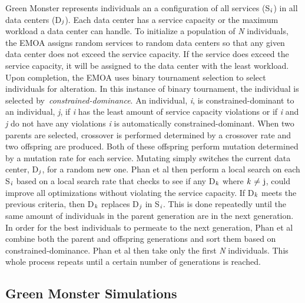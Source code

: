 \documentclass{sig-alternate}
\begin{document}
Green Monster represents individuals an a configuration of all services (S$_{\text{\emph{i}}}$) in all data centers (D$_{\text{\emph{j}}}$). Each data center has a service capacity
or the maximum workload a data center can handle. To initialize a population of \emph{N} individuals, the EMOA assigns random services to random data centers so that any given data center does not exceed the service capacity. If the service does exceed the service capacity, it will be assigned to the data center with the least workload. Upon completion, the EMOA uses binary tournament selection to select individuals for alteration. In this instance of binary tournament, the individual is selected by~\emph{constrained-dominance}. An individual, \emph{i},  is constrained-dominant to an individual, \emph{j}, if \emph{i} has the least amount of service capacity violations or if \emph{i} and \emph{j} do not have any violations \emph{i} is automatically constrained-dominant. When two parents are selected, crossover is performed determined by a crossover rate and two offspring are produced. Both of these offspring perform mutation determined by a mutation rate for each service. Mutating simply switches the current data center, D$_{\text{\emph{j}}}$, for a random new one. Phan et al then perform a local search on each S$_{\text{\emph{i}}}$  based on a local search rate that checks to see if any D$_{\text{\emph{k}}}$ where ${\text{\emph{k} ${\neq}$ j}}$, could improve all optimizations without violating the service capacity. If D$_{\text{\emph{k}}}$ meets the previous criteria, then D$_{\text{\emph{k}}}$ replaces D$_{\text{\emph{j}}}$ in S$_{\text{\emph{i}}}$. This is done repeatedly until the same amount of individuals in the parent generation are in the next generation. In order for the best individuals to permeate to the next generation, Phan et al combine both the parent and offspring generations and sort them based on constrained-dominance. Phan et al then take only the first \emph{N} individuals. This whole process repeats until a certain number of generations is reached. 

\subsection{Green Monster Simulations}
\label{sec:GMSims}
 
\end{document}
